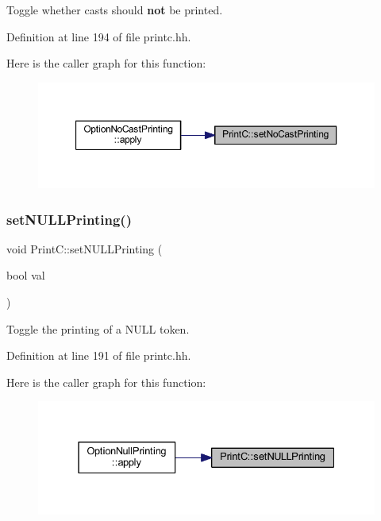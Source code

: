 Toggle whether casts should {\bfseries{not}} be printed. 



Definition at line 194 of file printc.\+hh.

Here is the caller graph for this function\+:
\nopagebreak
\begin{figure}[H]
\begin{center}
\leavevmode
\includegraphics[width=350pt]{class_print_c_a6801ebff79bee1bb2c7a413a4edcfb97_icgraph}
\end{center}
\end{figure}
\mbox{\label{class_print_c_a2394a8c394eed5b6c72b467e06949d95}} 
\subsubsection{\texorpdfstring{setNULLPrinting()}{setNULLPrinting()}}
{\footnotesize\ttfamily void Print\+C\+::set\+N\+U\+L\+L\+Printing (\begin{DoxyParamCaption}\item[{bool}]{val }\end{DoxyParamCaption})\hspace{0.3cm}{\ttfamily [inline]}}



Toggle the printing of a \textquotesingle{}N\+U\+LL\textquotesingle{} token. 



Definition at line 191 of file printc.\+hh.

Here is the caller graph for this function\+:
\nopagebreak
\begin{figure}[H]
\begin{center}
\leavevmode
\includegraphics[width=331pt]{class_print_c_a2394a8c394eed5b6c72b467e06949d95_icgraph}
\end{center}
\end{figure}


